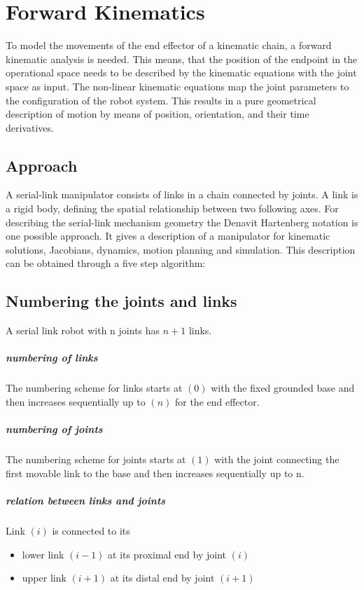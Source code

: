 \chapter{Forward Kinematics}

To model the movements of the end effector of a kinematic chain, a forward kinematic analysis is needed. This means, that the position of the endpoint in the operational space needs to be described by the kinematic equations with the joint space as input. The non-linear kinematic equations map the joint parameters to the configuration of the robot system.   This results in a pure geometrical description of motion  by means of position, orientation, and their time derivatives.

\section{Approach}
A serial-link manipulator consists of links in a chain connected by joints. 
A link is a rigid body, defining the spatial relationship between two following axes.
For describing the serial-link mechanism geometry the Denavit Hartenberg notation is one possible approach.
It gives a description of a manipulator for kinematic solutions, Jacobians, dynamics, motion planning and simulation. 
This description can be obtained through a five step algorithm:\cite{ConstantinForwardKA}

\section{Numbering the joints and links}
A serial link robot with n joints has $n+1$ links. 

\paragraph{numbering of links}
The numbering scheme for links starts at $(0)$ with the fixed grounded base and then increases sequentially up to $(n)$ for the end effector.

\paragraph{numbering of joints}
The numbering scheme for joints starts at $(1)$ with the joint connecting the first movable link to the base and then increases sequentially up to n.

\paragraph{relation between links and joints}
Link $(i)$ is connected to its 
\begin{itemize}
	\item lower link $(i-1)$ at its proximal \cite{proxdist} end by joint $(i)$
	\item upper link $(i+1)$ at its distal \cite{proxdist} end by joint $(i+1)$
\end{itemize}

